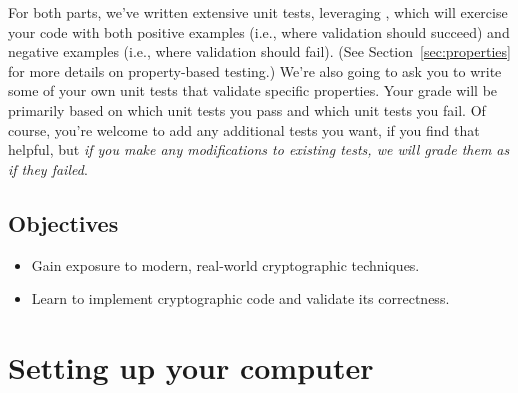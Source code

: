 For both parts, we've written extensive unit tests, leveraging
,
which will exercise your code with both positive examples (i.e., where
validation should succeed) and negative examples (i.e., where
validation should fail). (See Section~\ref{sec:properties} for more
details on property-based testing.) We're also going to ask you to write some of
your own unit tests that validate specific properties. Your grade will
be primarily based on which unit tests you pass and which unit tests
you fail. Of course, you're welcome to add any additional tests you
want, if you find that helpful, but {\em if you make any modifications to
existing tests, we will grade them as if they failed}.

\vspace{-6pt}
\subsection{Objectives}
\begin{itemize}\itemsep=0ex
\item Gain exposure to modern, real-world cryptographic techniques.
\item Learn to implement cryptographic code and validate its correctness.
\end{itemize}


\section{Setting up your computer}


